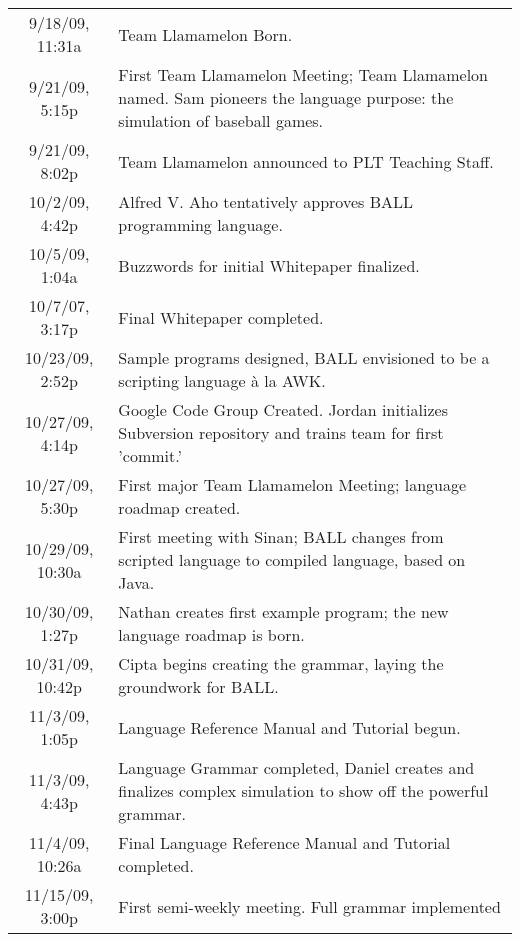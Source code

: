 \begin{center}
\tablelasttail{\hline}
\small

\begin{supertabular}{|c|p{5in}|}
9/18/09, 11:31a & Team Llamamelon Born.\\
9/21/09, 5:15p & First Team Llamamelon Meeting; Team Llamamelon
named. Sam pioneers the language purpose: the simulation of baseball
games.\\
9/21/09, 8:02p & Team Llamamelon announced to PLT Teaching Staff.\\
10/2/09, 4:42p & Alfred V. Aho tentatively approves BALL programming
language.\\
10/5/09, 1:04a & Buzzwords for initial Whitepaper finalized.\\
10/7/07, 3:17p & Final Whitepaper completed.\\
10/23/09, 2:52p & Sample programs designed, BALL envisioned to be a
scripting language \`{a} la AWK.\\
10/27/09, 4:14p & Google Code Group Created. Jordan initializes
Subversion repository and trains team for first 'commit.'\\
10/27/09, 5:30p & First major Team Llamamelon Meeting; language
roadmap created.\\
10/29/09, 10:30a & First meeting with Sinan; BALL changes from
scripted language to compiled language, based on Java.\\
10/30/09, 1:27p & Nathan creates first example program; the new
language roadmap is born.\\
10/31/09, 10:42p & Cipta begins creating the grammar, laying the
groundwork for BALL.\\
11/3/09, 1:05p & Language Reference Manual and Tutorial begun.\\
11/3/09, 4:43p & Language Grammar completed, Daniel creates and
finalizes complex simulation to show off the powerful grammar.\\
11/4/09, 10:26a & Final Language Reference Manual and Tutorial
completed.\\
11/15/09, 3:00p & First semi-weekly meeting. Full grammar implemented

\end{supertabular}
\end{center}
